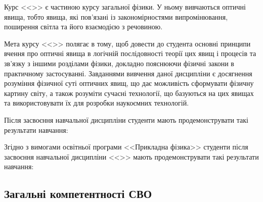 \documentclass{Syllabus}
\begin{document}
Курс <<\discipline>> є частиною курсу загальної фізики. У ньому вивчаються оптичні явища, тобто явища, які пов'язані із закономірностями випромінювання, поширення світла та його взаємодією з речовиною.

Мета курсу <<\discipline>> полягає в тому, щоб довести до студента основні принципи вчення про оптичні явища в логічній послідовності теорії цих явищ і процесів та зв'язку з іншими розділами фізики, докладно пояснюючи фізичні закони в практичному застосуванні. Завданнями вивчення даної дисципліни є досягнення розуміння фізичної суті оптичних явищ, що дає можливість сформувати фізичну картину світу, а також розуміти сучасні технології, що базуються на цих явищах та використовувати їх для розробки наукоємних технологій.


Після засвоєння навчальної дисципліни студенти мають продемонструвати такі результати навчання:


Згідно з вимогами освітньої програми <<Прикладна фізика>>
студенти після засвоєння навчальної дисципліни <<\discipline>> мають продемонструвати такі результати навчання:

\subsection*{Загальні компетентності СВО}
\end{document}
